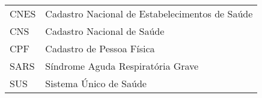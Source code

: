 
\begin{center}
  \begin{tabularx}{\textwidth}{
    >{\raggedright\arraybackslash}m{} 
    >{\raggedright\arraybackslash}X }
    CNES & Cadastro Nacional de Estabelecimentos de Saúde \\
    CNS  & Cadastro Nacional de Saúde \\
    CPF  & Cadastro de Pessoa Física \\
    SARS & Síndrome Aguda Respiratória Grave \\
    SUS  & Sistema Único de Saúde \\
  \end{tabularx}
  \label{tab:abbr}
\end{center}
